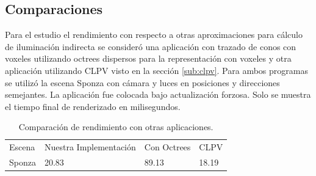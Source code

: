 \subsection{Comparaciones} %
\label{sub:comparasiones}
Para el estudio el rendimiento con respecto a otras aproximaciones para cálculo de iluminación indirecta se consideró una aplicación con trazado de conos con voxeles utilizando octrees dispersos para la representación con voxeles y otra aplicación utilizando \acl{CLPV} visto en la sección \ref{sub:clpv}. Para ambos programas se utilizó la escena Sponza con cámara y luces en posiciones y direcciones semejantes. La aplicación fue colocada bajo actualización forzosa. Solo se muestra el tiempo final de renderizado en milisegundos.

\begin{table}[h]
\centering
\begin{tabular}{llll}
                             &                                             &                                  &                            \\ \hline
\multicolumn{1}{|l|}{Escena} & \multicolumn{1}{l|}{Nuestra Implementación} & \multicolumn{1}{l|}{Con Octrees} & \multicolumn{1}{l|}{CLPV}  \\ \hline
\multicolumn{1}{|l|}{Sponza} & \multicolumn{1}{l|}{20.83}                  & \multicolumn{1}{l|}{89.13}      & \multicolumn{1}{l|}{18.19} \\ \hline
\end{tabular}
\caption{Comparación de rendimiento con otras aplicaciones.}
\label{tab:compare}
\end{table}


